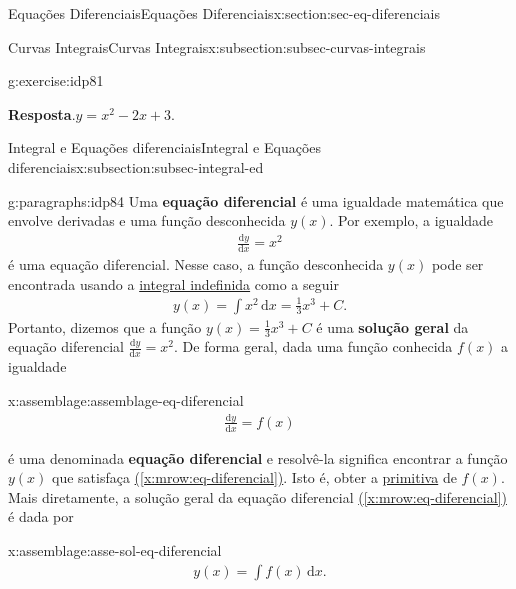 \documentclass[oneside,10pt,]{article}
\newcommand{\blocktitlefont}{\relax}
\newcommand{\xreffont}{\relax}
\newcommand{\terminology}[1]{\textbf{#1}}
\numberwithin{equation}{section}
\newcommand{\dd}{\mathrm{d}}
\newcommand{\integral}[2]{\displaystyle\int {#1}\,\dd {#2}}
\begin{document}
\begin{sectionptx}{Equações Diferenciais}{}{Equações Diferenciais}{}{}{x:section:sec-eq-diferenciais}
\begin{subsectionptx}{Curvas Integrais}{}{Curvas Integrais}{}{}{x:subsection:subsec-curvas-integrais}
\begin{inlineexercise}{}{g:exercise:idp81}
\par\smallskip%
\noindent\textbf{\blocktitlefont Resposta}.\hypertarget{g:answer:idp83}{}\quad{}\(y=x^2-2x+3\).%
\end{inlineexercise}%
\end{subsectionptx}
%
%
\typeout{************************************************}
\typeout{************************************************}
%
\begin{subsectionptx}{Integral e Equações diferenciais}{}{Integral e Equações diferenciais}{}{}{x:subsection:subsec-integral-ed}
\begin{paragraphs}{}{g:paragraphs:idp84}%
Uma \terminology{equação diferencial}  é uma igualdade matemática que envolve   derivadas e uma função desconhecida \(y(x)\). Por exemplo, a igualdade%
\begin{gather*}
\frac{\dd y}{\dd x} = x^2 
\end{gather*}
é uma equação diferencial. Nesse caso, a função desconhecida \(y(x)\) pode ser encontrada usando a \hyperref[x:mrow:eq-integral-indefinida]{integral indefinida} como a seguir%
\begin{gather*}
y(x) = \integral{x^2}{x}=\frac{1}{3}x^3 +C.
\end{gather*}
Portanto, dizemos que a função \(y(x)=\frac{1}{3}x^3 +C\) é uma \terminology{solução geral} da equação diferencial \(\frac{\dd y}{\dd x} = x^2\). De forma geral, dada uma função conhecida \(f(x)\) a igualdade \begin{assemblage}{}{x:assemblage:assemblage-eq-diferencial}%
%
\begin{gather}
\frac{\dd y}{\dd x} = f(x)\label{x:mrow:eq-diferencial}
\end{gather}
%
\end{assemblage}
 é uma denominada \terminology{equação diferencial} e resolvê-la significa encontrar a função \(y(x)\) que  satisfaça \hyperref[x:mrow:eq-diferencial]{({\xreffont\ref{x:mrow:eq-diferencial}})}. Isto é, obter a \hyperref[x:definition:def-primitiva]{primitiva} de \(f(x)\). Mais diretamente, a solução geral da equação diferencial \hyperref[x:mrow:eq-diferencial]{({\xreffont\ref{x:mrow:eq-diferencial}})} é dada por%
\end{paragraphs}%
\begin{assemblage}{}{x:assemblage:asse-sol-eq-diferencial}%
%
\begin{gather}
y(x)=\integral{f(x)}{x}\text{.}\label{g:mrow:idp85}
\end{gather}
%
\end{assemblage}

\end{subsectionptx}
\end{sectionptx}
\end{document}
